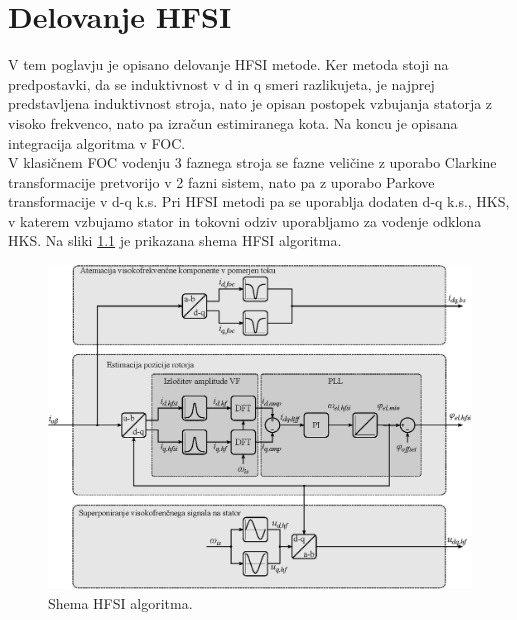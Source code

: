 \documentclass[a4paper,twoside,openright,12pt,slovene]{book}
\begin{document}
\chapter{Delovanje HFSI} \label{teorija}


V tem poglavju je opisano delovanje HFSI metode. Ker metoda stoji na predpostavki, da se induktivnost v d in q smeri razlikujeta, je najprej predstavljena induktivnost stroja, nato je
opisan postopek vzbujanja statorja z visoko frekvenco, nato pa izračun estimiranega kota. Na koncu je opisana integracija algoritma v FOC.
\\
V klasičnem FOC vodenju 3 faznega stroja se fazne veličine z uporabo Clarkine transformacije pretvorijo v 2 fazni sistem, nato pa z uporabo Parkove transformacije v d-q k.s. Pri HFSI metodi pa se
uporablja dodaten d-q k.s., HKS, v katerem vzbujamo stator in tokovni odziv uporabljamo za vodenje odklona HKS. Na sliki \ref{hfsiMetoda} je prikazana shema HFSI algoritma.

\begin{figure}[!htbp]
    \centering
    \includegraphics[width=1\columnwidth]{Slike/Inkscape/HFSI.eps}
    \caption{\label{hfsiMetoda} Shema HFSI algoritma.}
\end{figure}
\end{document}
